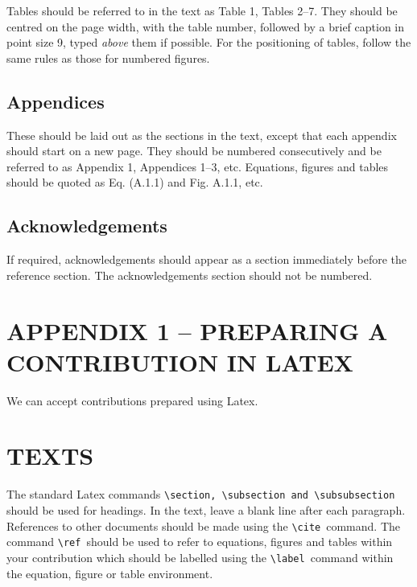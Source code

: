 \documentclass{article}
\begin{document}
Tables should be referred to in the text as Table 1, Tables 2--7.
They should be centred on the page width, with the table
number, followed by a brief caption in point size 9, typed
{\it above} them if possible. For the
positioning of tables, follow the same rules as those for numbered figures.

\subsection{Appendices}

These should be laid out as the sections in the text,
except that each appendix should start on a new page.
They should be numbered consecutively and be referred
to as Appendix 1, Appendices 1--3, etc. 
Equations, figures and tables should be
quoted as Eq. (A.1.1) and Fig. A.1.1, etc.  

\subsection*{Acknowledgements}

If required, acknowledgements  should appear as a section
immediately before the reference section.
The acknowledgements section should not be numbered.


\section*{APPENDIX 1 -- PREPARING A CONTRIBUTION IN LATEX}

We can accept contributions prepared using Latex.

\section*{TEXTS}

The standard Latex commands \verb|\section, \subsection and \subsubsection|~
should be used for headings.
In the text, leave a blank line after each paragraph.
References to other documents should be
made using the \verb|\cite|~command.
The command \verb|\ref|~should be used to refer to 
equations, figures and tables within your contribution
which should be labelled using the \verb|\label|~command within the 
equation, figure or table environment.
\end{document}
